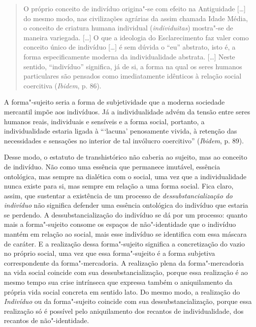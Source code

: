 \begin{quote}
O próprio conceito de indivíduo origina"-se com efeito na Antiguidade
[\ldots{}] do mesmo modo, nas civilizações agrárias da assim chamada
Idade Média, o conceito de criatura humana individual
(\emph{individuitas}) mostra"-se de maneira variegada. [\ldots{}] O que a
ideologia do Esclarecimento faz valer como conceito único de indivíduo
[\ldots{}] é sem dúvida o ``eu'' abstrato, isto é, a forma
especificamente moderna da individualidade abstrata. [\ldots{}] Neste
sentido, ``indivíduo'' significa, já de si, a forma na qual os seres
humanos particulares são pensados como imediatamente idênticos à relação
social coercitiva (\emph{Ibidem}, p. 86).
\end{quote}

A forma"-sujeito seria a forma de subjetividade que a moderna sociedade
mercantil impõe aos indivíduos. Já a individualidade advém da tensão
entre seres humanos reais, individuais e sensíveis e a forma social,
portanto, a individualidade estaria ligada à ```lacuna' penosamente
vivida, à retenção das necessidades e sensações no interior de tal
invólucro coercitivo'' (\emph{Ibidem}, p. 89).

Desse modo, o estatuto de transhistórico não caberia ao sujeito, mas ao
conceito de indivíduo. Não como uma essência que permanece imutável,
essência ontológica, mas sempre na dialética com o social, uma vez que a
individualidade nunca existe para si, mas sempre em relação a uma forma
social. Fica claro, assim, que sustentar a existência de um processo de
\emph{dessubstancialização do indivíduo} não significa defender uma
essência ontológica do indivíduo que estaria se perdendo. A
dessubstancialização do indivíduo se dá por um processo: quanto mais
a forma"-sujeito consome os espaços de não"-identidade que o indivíduo
mantém em relação ao social, mais esse indivíduo se identifica com essa
máscara de caráter. E a realização dessa forma"-sujeito significa a
concretização do vazio no próprio social, uma vez que essa forma"-sujeito
é a forma subjetiva correspondente da forma"-mercadoria. A realização
plena da forma"-mercadoria na vida social coincide com sua
dessubstancialização, porque essa realização é ao mesmo tempo sua crise intrínseca
que expressa também o aniquilamento da própria vida social concreta em sentido lato.
Do mesmo modo, a realização do \emph{Indivíduo} ou da forma"-sujeito coincide com
sua dessubstancialização, porque essa realização só é possível pelo
aniquilamento dos recantos de individualidade, dos recantos de
não"-identidade.

